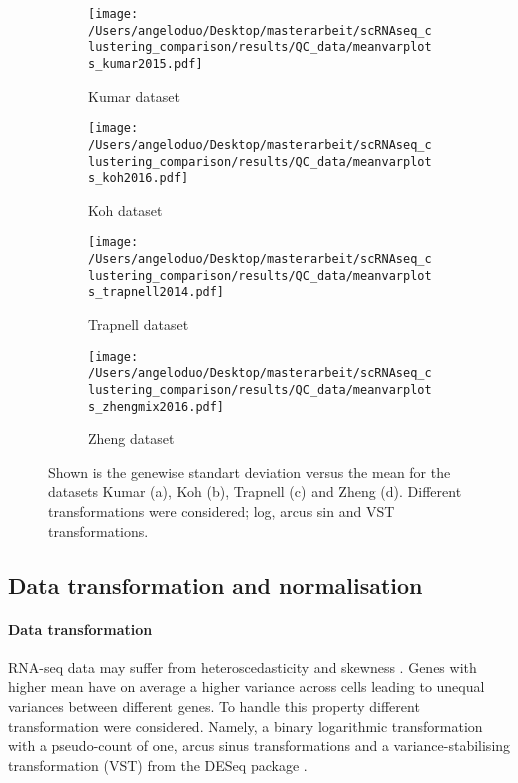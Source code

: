 \documentclass[12pt, a4paper]{article}\usepackage[]{graphicx}\usepackage[]{color}
\begin{document}
\begin{figure}
\centering
\begin{subfigure}{.5\textwidth}
  \centering
  \texttt{[image: /Users/angeloduo/Desktop/masterarbeit/scRNAseq\_clustering\_comparison/results/QC\_data/meanvarplots\_kumar2015.pdf]}
  \caption{Kumar dataset}
  \label{fig:transsim}
\end{subfigure}%
\begin{subfigure}{.5\textwidth}
  \centering
  \texttt{[image: /Users/angeloduo/Desktop/masterarbeit/scRNAseq\_clustering\_comparison/results/QC\_data/meanvarplots\_koh2016.pdf]}
  \caption{Koh dataset}
  \label{fig:transkoh}
\end{subfigure}
\begin{subfigure}{.5\textwidth}
  \centering
  \texttt{[image: /Users/angeloduo/Desktop/masterarbeit/scRNAseq\_clustering\_comparison/results/QC\_data/meanvarplots\_trapnell2014.pdf]}
  \caption{Trapnell dataset}
  \label{fig:transtrapnell}
\end{subfigure}%
\begin{subfigure}{.5\textwidth}
  \centering
  \texttt{[image: /Users/angeloduo/Desktop/masterarbeit/scRNAseq\_clustering\_comparison/results/QC\_data/meanvarplots\_zhengmix2016.pdf]}
  \caption{Zheng dataset}
  \label{fig:transzheng}
\end{subfigure}
\caption{Shown is the genewise standart deviation versus the mean for the datasets Kumar (a), Koh (b), Trapnell (c) and Zheng (d). Different transformations were considered; log, arcus sin and VST transformations. }
\label{fig:trans}
\end{figure}

\newpage
\subsection{Data transformation and normalisation}\label{ssec:norm}
\paragraph{Data transformation}
RNA-seq data may suffer from heteroscedasticity and skewness \citep{zwiener2014transforming}. Genes with higher mean have on average a higher variance across cells leading to unequal variances between different genes. 
To handle this property different transformation were considered. Namely, a binary logarithmic transformation with a pseudo-count of one, arcus sinus transformations and a variance-stabilising transformation (VST) from the DESeq package \citep{anders2010differential}. 
\end{document}
